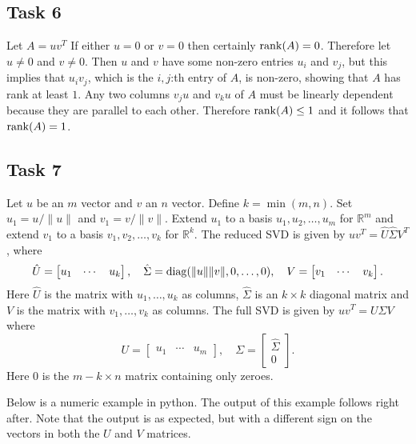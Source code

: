 \documentclass[a4paper,12pt]{article}
\begin{document}
\subsection*{Task 6}

Let \(A = uv^T\)
If either \(u = 0\) or \(v = 0\) then certainly \(\mathrm{rank}(A) = 0\).
Therefore let \(u \ne 0\) and \(v \ne 0\).
Then \(u\) and \(v\) have some non-zero entries \(u_i\) and \(v_j\), but this
implies that \(u_i v_j\), which is the \(i,j\):th entry of \(A\), is non-zero,
showing that \(A\) has rank at least \(1\).
Any two columns \(v_j u\) and \(v_k u\) of \(A\) must be linearly dependent
because they are parallel to each other.
Therefore \(\mathrm{rank}(A) \le 1\) and it follows that \(\mathrm{rank}(A) = 1\).


\subsection*{Task 7}

Let \(u\) be an \(m\) vector and \(v\) an \(n\) vector.
Define \(k = \min(m,n)\).
Set \(u_1 = u/\|u\|\) and \(v_1 = v/\|v\|\).
Extend \(u_1\) to a basis \(u_1, u_2, \dots, u_m\) for \(\mathbb{R}^m\) and
extend \(v_1\) to a basis \(v_1, v_2, \dots, v_k\) for \(\mathbb{R}^k\).
The reduced SVD is given by \(uv^T = \hat{U} \hat{\Sigma} V^T\), where
\[
  \hat{U} =
    \begin{bmatrix}
      u_1 & \cdots & u_k
    \end{bmatrix}, \quad
  \hat{\Sigma} = \mathrm{diag}(\|u\|\|v\|, 0, \dots, 0),\quad
  V =
    \begin{bmatrix}
      v_1 & \cdots & v_k
    \end{bmatrix}.
\]
Here \(\hat{U}\) is the matrix with \(u_1,\dots,u_k\) as columns,
\(\hat{\Sigma}\) is an \(k \times k\) diagonal matrix and \(V\) is the matrix
with \(v_1,\dots,v_k\) as columns.
The full SVD is given by \(uv^T = U \Sigma V\) where
\[
  U =
    \begin{bmatrix}
      u_1 & \cdots & u_m
    \end{bmatrix},\quad
  \Sigma =
    \begin{bmatrix}
      \hat{\Sigma} \\
      0
    \end{bmatrix}.
\]
Here 0 is the \(m-k \times n\) matrix containing only zeroes.

Below is a numeric example in python.
The output of this example follows right after.
Note that the output is as expected, but with a different sign on the vectors in
both the \(U\) and \(V\) matrices.


\end{document}
